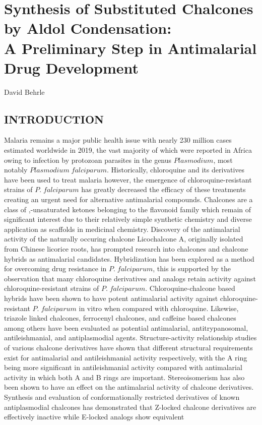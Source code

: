 \documentclass[11pt]{article}
\begin{document}
\linespread{1.25}
\raggedright
\setlength{\parskip}{2pt}
\setlength{\belowcaptionskip}{-8pt}
\def\citenumfont{\textit}
\renewcommand{\bibsection}{}

\section*{Synthesis of Substituted Chalcones by Aldol Condensation: \\ A Preliminary Step in Antimalarial Drug Development}

David Behrle

\subsection*{INTRODUCTION}
Malaria remains a major public health issue with nearly 230 million cases estimated worldwide in 2019, the vast majority of which were reported in Africa owing to infection by protozoan parasites in the genus $Plasmodium$, most notably $Plasmodium\; falciparum$.\cite{Fikadu2023} Historically, chloroquine and its derivatives have been used to treat malaria however, the emergence of chloroquine-resistant strains of $P.\; falciparum$ has greatly decreased the efficacy of these treatments creating an urgent need for alternative antimalarial compounds.\cite{Fikadu2023,Yadav2012} Chalcones are a class of \textalpha,\textbeta-unsaturated ketones belonging to the flavonoid family which remain of significant interest due to their relatively simple synthetic chemistry and diverse application as scaffolds in medicinal chemistry.\cite{Qin2020} Discovery of the antimalarial activity of the naturally occuring chalcone Licochalcone A, originally isolated from Chinese licorice roots, has prompted research into chalcones and chalcone hybrids as antimalarial candidates.\cite{Cheng2020,Chen1994} Hybridization has been explored as a method for overcoming drug resistance in $P.\; falciparum$, this is supported by the observation that many chloroquine derivatives and analogs retain activity against chloroquine-resistant strains of $P.\; falciparum$.\cite{Cheng2020,Sashidhara2012} Chloroquine-chalcone based hybrids have been shown to have potent antimalarial activity against chloroquine-resistant $P.\; falciparum$ in vitro when compared with chloroquine.\cite{Sashidhara2012} Likewise, triazole linked chalcones, ferrocenyl chalcones, and caffeine based chalcones among others have been evaluated as potential antimalarial, antitrypanosomal, antileishmanial, and antiplasmodial agents.\cite{Qin2020,Singh2017,Insuasty2015} Structure-activity relationship studies of various chalcone derivatives have shown that different structural requirements exist for antimalarial and antileishmanial activity respectively, with the A ring being more significant in antileishmanial activity compared with antimalarial activity in which both A and B rings are important.\cite{Liu2003} Stereoisomerism has also been shown to have an effect on the antimalarial activity of chalcone derivatives. Synthesis and evaluation of conformationally restricted derivatives of known antiplasmodial chalcones has demonstrated that Z-locked chalcone derivatives are effectively inactive while E-locked analogs show equivalent 
\end{document}
